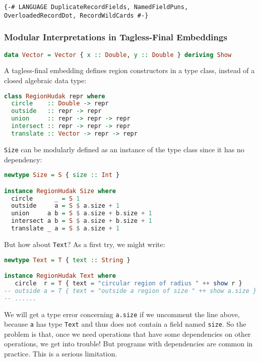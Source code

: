 \begin{lstlisting}
{-# LANGUAGE DuplicateRecordFields, NamedFieldPuns, OverloadedRecordDot, RecordWildCards #-}
\end{lstlisting}

\subsubsection{Modular Interpretations in Tagless-Final Embeddings}

\begin{lstlisting}[language=Haskell]
data Vector = Vector { x :: Double, y :: Double } deriving Show
\end{lstlisting}
\noindent
A tagless-final embedding defines region constructors in a type class,
instead of a closed algebraic data type:

\begin{lstlisting}[language=Haskell,deletekeywords={union,intersect}]
class RegionHudak repr where
  circle    :: Double -> repr
  outside   :: repr -> repr
  union     :: repr -> repr -> repr
  intersect :: repr -> repr -> repr
  translate :: Vector -> repr -> repr
\end{lstlisting}
\noindent
\lstinline!Size! can be modularly defined as an instance
of the type class since it has no dependency:

\begin{lstlisting}[language=Haskell,deletekeywords={union,intersect}]
newtype Size = S { size :: Int }

instance RegionHudak Size where
  circle      _ = S 1
  outside     a = S $ a.size + 1
  union     a b = S $ a.size + b.size + 1
  intersect a b = S $ a.size + b.size + 1
  translate _ a = S $ a.size + 1
\end{lstlisting}
\noindent
But how about \lstinline!Text!? As a first try, we might
write:

\begin{lstlisting}[language=Haskell]
newtype Text = T { text :: String }

instance RegionHudak Text where
   circle  r = T { text = "circular region of radius " ++ show r }
-- outside a = T { text = "outside a region of size " ++ show a.size }
-- ......
\end{lstlisting}
\noindent
We will get a type error concerning \lstinline!a.size! if
we uncomment the line above, because \lstinline!a! has
type \lstinline!Text! and thus does not contain a field
named \lstinline!size!. So the problem is that, once we
need operations that have some dependencies on other operations, we get
into trouble! But programs with dependencies are common in practice.
This is a serious limitation.

